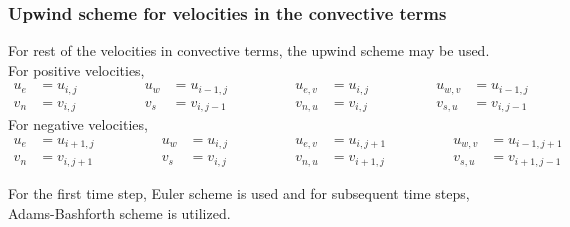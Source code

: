 \documentclass[12pt,a4paper,fleqn]{article}
\begin{document}
\subsubsection{Upwind scheme for velocities in the convective terms}
For rest of the velocities in convective terms, the upwind scheme may be used. For positive velocities,
\begin{equation*}
\begin{aligned}
u_e &= u_{i,j}\\
v_n &= v_{i,j}
\end{aligned}
\qquad\qquad
\begin{aligned}
u_w &= u_{i-1,j}\\
v_s &= v_{i,j-1}
\end{aligned}
\qquad\qquad
\begin{aligned}
u_{e,v} &= u_{i,j}\\
v_{n,u} &= v_{i,j}
\end{aligned}
\qquad\qquad
\begin{aligned}
u_{w,v} &= u_{i-1,j}\\ 
v_{s,u} &= v_{i,j-1}
\end{aligned}
\end{equation*}
For negative velocities,
\begin{equation*}
\begin{aligned}
u_e &= u_{i+1,j}\\
v_n &= v_{i,j+1}
\end{aligned}
\qquad\qquad
\begin{aligned}
u_w &= u_{i,j}\\
v_s &= v_{i,j}
\end{aligned}
\qquad\qquad
\begin{aligned}
u_{e,v} &= u_{i,j+1}\\
v_{n,u} &= v_{i+1,j}
\end{aligned}
\qquad\qquad
\begin{aligned}
u_{w,v} &= u_{i-1,j+1}\\ 
v_{s,u} &= v_{i+1,j-1}
\end{aligned}
\end{equation*}

For the first time step, Euler scheme is used and for subsequent time steps, Adams-Bashforth scheme is utilized.
\end{document}
